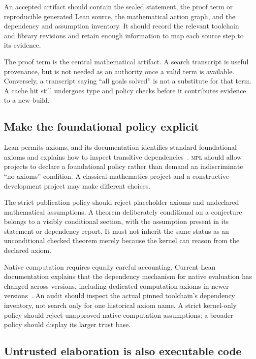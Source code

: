 \documentclass[11pt,a4paper]{article}
\newcommand{\MPL}{\textnormal{\textsc{mpl}}}
\theoremstyle{remark}
\begin{document}
An accepted artifact should contain the sealed statement, the proof term or reproducible generated Lean source, the mathematical action graph, and the dependency and assumption inventory. It should record the relevant toolchain and library revisions and retain enough information to map each source step to its evidence.

The proof term is the central mathematical artifact. A search transcript is useful provenance, but is not needed as an authority once a valid term is available. Conversely, a transcript saying ``all goals solved'' is not a substitute for that term. A cache hit still undergoes type and policy checks before it contributes evidence to a new build.

\subsection{Make the foundational policy explicit}

Lean permits axioms, and its documentation identifies standard foundational axioms and explains how to inspect transitive dependencies~\cite{lean-axioms}. \MPL{} should allow projects to declare a foundational policy rather than demand an indiscriminate ``no axioms'' condition. A classical-mathematics project and a constructive-development project may make different choices.

The strict publication policy should reject placeholder axioms and undeclared mathematical assumptions. A theorem deliberately conditional on a conjecture belongs to a visibly conditional section, with the assumption present in its statement or dependency report. It must not inherit the same status as an unconditional checked theorem merely because the kernel can reason from the declared axiom.

Native computation requires equally careful accounting. Current Lean documentation explains that the dependency mechanism for native evaluation has changed across versions, including dedicated computation axioms in newer versions~\cite{lean-validation}. An audit should inspect the actual pinned toolchain's dependency inventory, not search only for one historical axiom name. A strict kernel-only policy should reject unapproved native-computation assumptions; a broader policy should display its larger trust base.

\subsection{Untrusted elaboration is also executable code}
\end{document}

